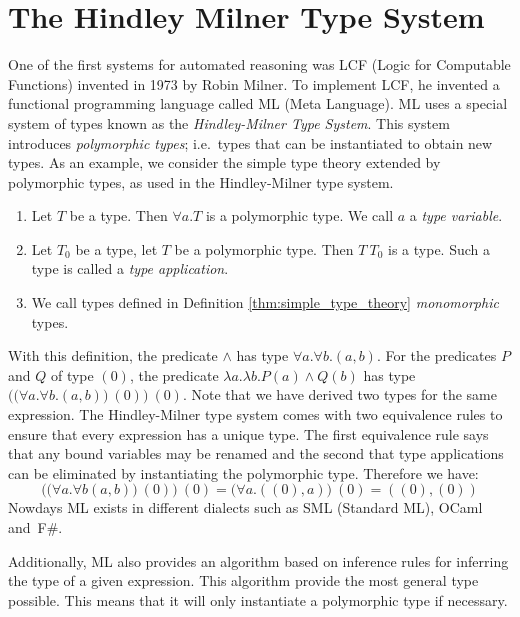 \documentclass[]{scrbook}
\theoremstyle{definition}
\theoremstyle{definition}
\theoremstyle{definition}
\theoremstyle{remark}
\let\BeginKnitrBlock\begin \let\EndKnitrBlock\end
\begin{document}
\section{The Hindley Milner Type
System}\label{the-hindley-milner-type-system}

One of the first systems for automated reasoning was LCF (Logic for
Computable Functions) invented in 1973 by Robin Milner. To implement
LCF, he invented a functional programming language called ML (Meta
Language). ML uses a special system of types known as the
\emph{Hindley-Milner Type System}. This system introduces
\emph{polymorphic types}; i.e.~types that can be instantiated to obtain
new types. As an example, we consider the simple type theory extended by
polymorphic types, as used in the Hindley-Milner type system.

\BeginKnitrBlock{definition}[Polymorphic Types for Simple Type Theory]
\protect\hypertarget{def:unnamed-chunk-3}{}{\label{def:unnamed-chunk-3}
{} }

\begin{enumerate}
\item Let $T$ be a type. Then $\forall a. T$ is a polymorphic type. We call $a$ a \textit{type variable}.
\item Let $T_0$ be a type, let $T$ be a polymorphic type. Then $T\ T_0$ is a type. Such a type is called a \textit{type application}.
\item We call types defined in Definition \ref{thm:simple_type_theory} \textit{monomorphic} types.
\end{enumerate}
\EndKnitrBlock{definition}

With this definition, the predicate \(\land\) has type
\(\forall a.\forall b.(a,b)\). For the predicates \(P\) and \(Q\) of
type \((0)\), the predicate \(\lambda a.\lambda b.P(a) \land Q(b)\) has
type \(\Big(\Big(\forall a.\forall b.(a,b)\Big)\ (0) \Big) \ (0)\). Note
that we have derived two types for the same expression. The
Hindley-Milner type system comes with two equivalence rules to ensure
that every expression has a unique type. The first equivalence rule says
that any bound variables may be renamed and the second that type
applications can be eliminated by instantiating the polymorphic type.
Therefore we have: \[
\Big(\Big(\forall a.\forall b (a,b)\Big)\ (0)\Big) \ (0) = \Big(\forall a. ((0),a)\Big) \ (0)= ((0),(0))
\] Nowdays ML exists in different dialects such as SML (Standard ML),
OCaml and~F\#.

Additionally, ML also provides an algorithm based on inference rules for
inferring the type of a given expression. This algorithm provide the
most general type possible. This means that it will only instantiate a
polymorphic type if necessary.
\end{document}
